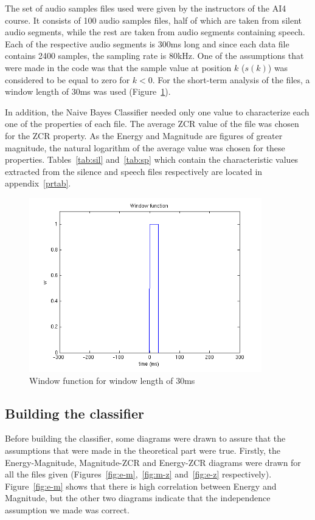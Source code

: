 \documentclass{article}
\begin{document}
The set of audio samples files used were given by the instructors of the AI4 course.
It consists of 100 audio samples files, half of which are taken from silent audio segments, while the rest are taken from audio segments containing speech.
Each of the respective audio segments is 300ms long and since each data file contains 2400 samples, the sampling rate is 80kHz.
One of the assumptions that were made in the code was that the sample value at position \(k\) (\(s(k)\)) was considered to be equal to zero for \(k<0\). For the short-term analysis of the files, a window length of 30ms was used (Figure~\ref{fig:window}).

In addition, the Naive Bayes Classifier needed only one value to characterize each one of the properties of each file.
The average ZCR value of the file was chosen for the ZCR property.
As the Energy and Magnitude are figures of greater magnitude, the natural logarithm of the average value was chosen for these properties.
Tables~\ref{tab:sil} and~\ref{tab:sp} which contain the characteristic values extracted from the silence and speech files respectively are located in appendix~\ref{prtab}.

\begin{figure}[h!]
  \centering
  \includegraphics[width=0.9\textwidth]{window}
  \caption{Window function for window length of 30ms}
  \label{fig:window}
\end{figure}

\subsection{Building the classifier}

Before building the classifier, some diagrams were drawn to assure that the assumptions that were made in the theoretical part were true. 
Firstly, the Energy-Magnitude, Magnitude-ZCR and Energy-ZCR diagrams were drawn for all the files given (Figures~\ref{fig:e-m},~\ref{fig:m-z} and~\ref{fig:e-z} respectively). 
Figure~\ref{fig:e-m} shows that there is high correlation between Energy and Magnitude, but the other two diagrams indicate that the independence assumption we made was correct.
\end{document}
